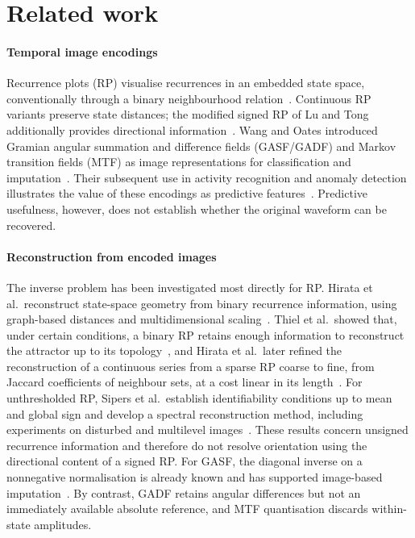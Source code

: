 \documentclass[preprint,review,12pt]{elsarticle}
\begin{document}
\section{Related work}\label{sec:related}

\paragraph{Temporal image encodings}
Recurrence plots (RP) visualise recurrences in an embedded state space, conventionally through a binary neighbourhood relation~\cite{eckmann1987recurrence,marwan2007recurrence}. Continuous RP variants preserve state distances; the modified signed RP of Lu and Tong additionally provides directional information~\cite{lu2019robust}. Wang and Oates introduced Gramian angular summation and difference fields (GASF/GADF) and Markov transition fields (MTF) as image representations for classification and imputation~\cite{wang2015encoding,wang2015encoding2}. Their subsequent use in activity recognition and anomaly detection illustrates the value of these encodings as predictive features~\cite{ahmad2021inertial,ma2024anomaly}. Predictive usefulness, however, does not establish whether the original waveform can be recovered.

\paragraph{Reconstruction from encoded images}
The inverse problem has been investigated most directly for RP. Hirata et al.\ reconstruct state-space geometry from binary recurrence information, using graph-based distances and multidimensional scaling~\cite{hirata2008reproduction,hirata2016chromosome}. Thiel et al.\ showed that, under certain conditions, a binary RP retains enough information to reconstruct the attractor up to its topology~\cite{thiel2004information}, and Hirata et al.\ later refined the reconstruction of a continuous series from a sparse RP coarse to fine, from Jaccard coefficients of neighbour sets, at a cost linear in its length~\cite{hirata2021fast}. For unthresholded RP, Sipers et al.\ establish identifiability conditions up to mean and global sign and develop a spectral reconstruction method, including experiments on disturbed and multilevel images~\cite{sipers2011unique,sipers2017robust}. These results concern unsigned recurrence information and therefore do not resolve orientation using the directional content of a signed RP. For GASF, the diagonal inverse on a nonnegative normalisation is already known and has supported image-based imputation~\cite{wang2015encoding,huamin2020reconstruction}. By contrast, GADF retains angular differences but not an immediately available absolute reference, and MTF quantisation discards within-state amplitudes.
\end{document}
